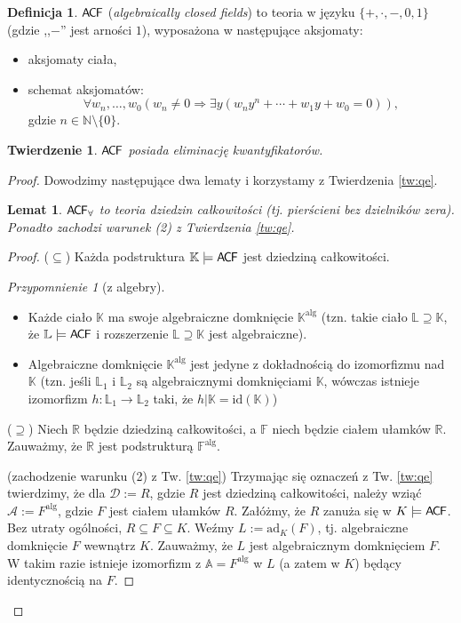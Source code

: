 \documentclass{article}
\newcommand{\N}{\mathbb{N}}
\newcommand{\A}{\mathbb{A}}
\newcommand{\id}{\text{id}}
\theoremstyle{plain}
\newtheorem{tw}[thm]{Twierdzenie}
\newtheorem{lem}[thm]{Lemat}
\theoremstyle{definition}
\newtheorem{df}[thm]{Definicja}
\theoremstyle{remark}
\newtheorem{przyp}[thm]{Przypomnienie}
\newcommand{\ACF}{\mathsf{A \mkern-2.0mu C \mkern-1.1mu F}}
\begin{document}
\begin{df}
	$\ACF$ (\textit{algebraically closed fields}) to teoria w języku $\{+,
	\cdot, -, 0, 1\}$ (gdzie ,,$-$'' jest arności $1$), wyposażona w
	następujące aksjomaty:
	\begin{itemize}
		\item aksjomaty ciała,
		\item schemat aksjomatów:
		$$\forall w_n, \ldots, w_0
			(w_n \neq 0 \Rightarrow
			\exists y (w_n y^n + \cdots + w_1y + w_0 = 0)),$$
			gdzie $n \in \N \setminus \{0\}$.
	\end{itemize}
\end{df}

\begin{tw}
	$\ACF$ posiada eliminację kwantyfikatorów.
\end{tw}
\begin{proof}
Dowodzimy następujące dwa lematy i korzystamy z Twierdzenia \ref{tw:qe}.

\begin{lem}
	$\ACF_{\forall}$ to teoria dziedzin całkowitości (tj. pierścieni bez
	dzielników zera). Ponadto zachodzi warunek (2) z Twierdzenia \ref{tw:qe}.
\end{lem}
\begin{proof}
	($\subseteq$) Każda podstruktura $\mathbb{K} \models \ACF$ jest dziedziną
	całkowitości.
\begin{przyp}[z algebry]
	~\begin{itemize}
		\item Każde ciało $\mathbb{K}$ ma swoje algebraiczne domknięcie
			$\mathbb{K}^{\text{alg}}$ (tzn. takie ciało $\mathbb{L}
			\supseteq \mathbb{K}$, że $\mathbb{L} \models \ACF$ i
			rozszerzenie $\mathbb{L} \supseteq \mathbb{K}$ jest
			algebraiczne).
		\item Algebraiczne domknięcie $\mathbb{K}^{\text{alg}}$ jest
			jedyne z dokładnością do izomorfizmu nad $\mathbb{K}$
			(tzn. jeśli $\mathbb{L}_1$ i $\mathbb{L}_2$ są
			algebraicznymi domknięciami $\mathbb{K}$, wówczas
			istnieje izomorfizm $h \colon \mathbb{L}_1
			\rightarrow \mathbb{L}_2$ taki, że $h|\mathbb{K} =
			\id(\mathbb{K})$)
	\end{itemize}
\end{przyp}
	($\supseteq$)
	Niech $\mathbb{R}$ będzie dziedziną całkowitości, a $\mathbb{F}$ niech
	będzie ciałem ułamków $\mathbb{R}$. Zauważmy, że $\mathbb{R}$ jest
	podstrukturą $\mathbb{F}^\text{alg}$.

	(zachodzenie warunku (2) z Tw. \ref{tw:qe})
	Trzymając się oznaczeń z Tw. \ref{tw:qe} twierdzimy, że dla
	$\mathcal{D} := R$, gdzie $R$ jest dziedziną całkowitości, należy wziąć
	$\mathcal{A} := F^\text{alg}$, gdzie $F$ jest ciałem ułamków $R$.
	Załóżmy, że $R$ zanuża się w $K \models \ACF$. Bez utraty ogólności,
	$R \subseteq F \subseteq K$. Weźmy $L := \text{ad}_K(F)$, %
	tj. algebraiczne domknięcie $F$ wewnątrz $K$. Zauważmy, że $L$ jest
	algebraicznym domknięciem $F$. W takim razie istnieje izomorfizm
	z $\A = F^\text{alg}$ w $L$ (a zatem w $K$) będący identycznością na $F$.
\end{proof}


\end{proof}
\end{document}
